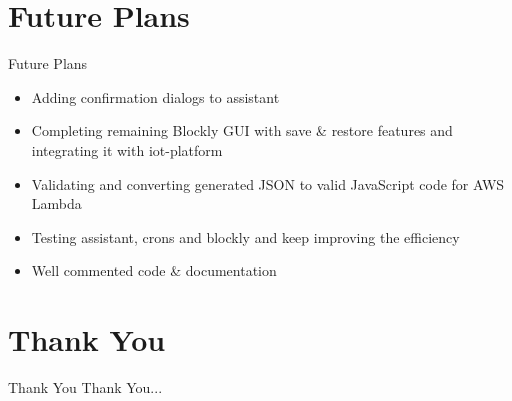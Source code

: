 \documentclass[10pt, a4paper]{beamer}
\begin{document}
\section{Future Plans}
\begin{frame}{Future Plans}
	\begin{itemize}
		\item Adding confirmation dialogs to assistant
		\newline\\
		\item Completing remaining Blockly GUI with save \& restore features and integrating it with iot-platform
		\newline\\
		\item Validating and converting generated JSON to valid JavaScript code for AWS Lambda
		\newline\\
		\item Testing assistant, crons and blockly and keep improving the efficiency
		\newline\\
		\item Well commented code \& documentation
	\end{itemize}
\end{frame}


\section{Thank You}
\begin{frame}{Thank You}
	\centering Thank You...
\end{frame}
\end{document}
